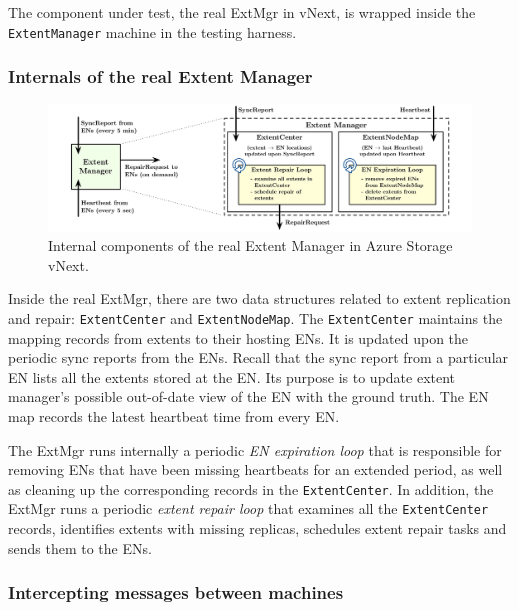 The component under test, the real ExtMgr in vNext, is wrapped inside the \texttt{ExtentManager} \psharp machine in the testing harness.

\subsubsection{Internals of the real Extent Manager}

\begin{figure}[t]
\centering
\includegraphics[width=.9\linewidth]{img/extent_manager}
\caption{Internal components of the real Extent Manager in Azure Storage vNext.}
\label{fig:extentmanager}
\end{figure}

Inside the real ExtMgr, there are two data structures related to extent replication and repair: \texttt{ExtentCenter} and \texttt{ExtentNodeMap}. The \texttt{ExtentCenter} maintains the mapping records from extents to their hosting ENs. It is updated upon the periodic sync reports from the ENs. Recall that the sync report from a particular EN lists all the extents stored at the EN. Its purpose is to update extent manager's possible out-of-date view of the EN with the ground truth. The EN map records the latest heartbeat time from every EN.

The ExtMgr runs internally a periodic {\em EN expiration loop} that is responsible for removing ENs that have been missing heartbeats for an extended period, as well as cleaning up the corresponding records in the \texttt{ExtentCenter}. In addition, the ExtMgr runs a periodic {\em extent repair loop} that examines all the \texttt{ExtentCenter} records, identifies extents with missing replicas, schedules extent repair tasks and sends them to the ENs.

\subsubsection{Intercepting messages between machines}
\label{sec:method:model:dispath}


